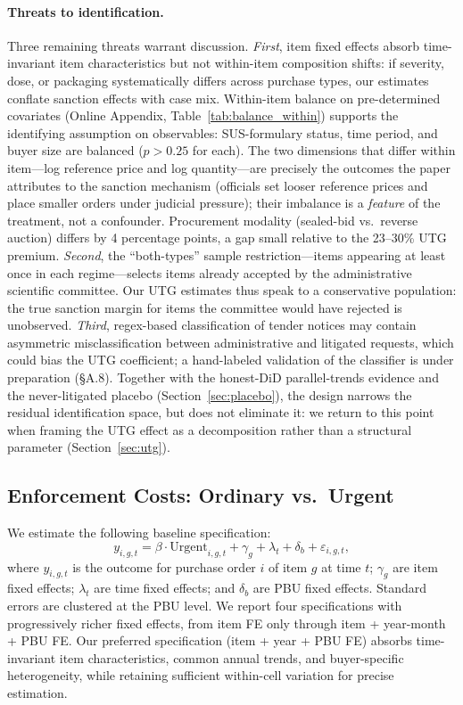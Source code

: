 \paragraph{Threats to identification.} Three remaining threats warrant discussion. \emph{First}, item fixed effects absorb time-invariant item characteristics but not within-item composition shifts: if severity, dose, or packaging systematically differs across purchase types, our estimates conflate sanction effects with case mix. Within-item balance on pre-determined covariates (Online Appendix, Table~\ref{tab:balance_within}) supports the identifying assumption on observables: SUS-formulary status, time period, and buyer size are balanced ($p>0.25$ for each). The two dimensions that differ within item---log reference price and log quantity---are precisely the outcomes the paper attributes to the sanction mechanism (officials set looser reference prices and place smaller orders under judicial pressure); their imbalance is a \emph{feature} of the treatment, not a confounder. Procurement modality (sealed-bid vs.\ reverse auction) differs by 4 percentage points, a gap small relative to the 23--30\% UTG premium. \emph{Second}, the ``both-types'' sample restriction---items appearing at least once in each regime---selects items already accepted by the administrative scientific committee. Our UTG estimates thus speak to a conservative population: the true sanction margin for items the committee would have rejected is unobserved. \emph{Third}, regex-based classification of tender notices may contain asymmetric misclassification between administrative and litigated requests, which could bias the UTG coefficient; a hand-labeled validation of the classifier is under preparation (\S A.8). Together with the honest-DiD parallel-trends evidence and the never-litigated placebo (Section~\ref{sec:placebo}), the design narrows the residual identification space, but does not eliminate it: we return to this point when framing the UTG effect as a decomposition rather than a structural parameter (Section~\ref{sec:utg}).

\subsection{Enforcement Costs: Ordinary vs.\ Urgent}

We estimate the following baseline specification:
\begin{equation}
\label{eq:baseline}
y_{i,g,t} = \beta \cdot \text{Urgent}_{i,g,t} + \gamma_g + \lambda_t + \delta_b + \varepsilon_{i,g,t},
\end{equation}
where $y_{i,g,t}$ is the outcome for purchase order $i$ of item $g$ at time $t$; $\gamma_g$ are item fixed effects; $\lambda_t$ are time fixed effects; and $\delta_b$ are PBU fixed effects. Standard errors are clustered at the PBU level. We report four specifications with progressively richer fixed effects, from item FE only through item + year-month + PBU FE. Our preferred specification (item + year + PBU FE) absorbs time-invariant item characteristics, common annual trends, and buyer-specific heterogeneity, while retaining sufficient within-cell variation for precise estimation.

